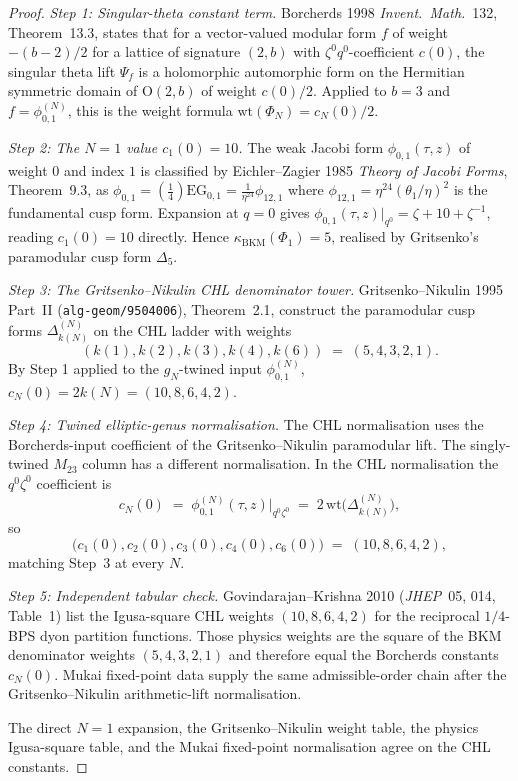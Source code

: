 \documentclass[11pt]{article}
\newcommand{\wt}{\mathrm{wt}}
\begin{document}
\begin{proof}
\emph{Step 1: Singular-theta constant term.} Borcherds 1998
\emph{Invent.\ Math.}~132, Theorem~13.3, states that for a vector-valued
modular form $f$ of weight $-(b-2)/2$ for a lattice of signature
$(2,b)$ with $\zeta^0 q^0$-coefficient $c(0)$, the singular theta lift
$\Psi_f$ is a holomorphic automorphic form on the Hermitian symmetric
domain of $\mathrm{O}(2,b)$ of weight $c(0)/2$. Applied to $b=3$ and
$f=\phi_{0,1}^{(N)}$, this is the weight formula
$\wt(\Phi_N)=c_N(0)/2$.

\emph{Step 2: The $N=1$ value $c_1(0)=10$.} The weak Jacobi form
$\phi_{0,1}(\tau,z)$ of weight $0$ and index $1$ is classified by
Eichler--Zagier 1985 \emph{Theory of Jacobi Forms}, Theorem~9.3, as
$\phi_{0,1}=(\tfrac{1}{4})\mathrm{EG}_{0,1}=\tfrac{1}{\eta^{24}}
\phi_{12,1}$ where $\phi_{12,1}=\eta^{24}(\theta_1/\eta)^2$ is the
fundamental cusp form. Expansion at $q=0$ gives
$\phi_{0,1}(\tau,z)|_{q^0}=\zeta+10+\zeta^{-1}$, reading
$c_1(0)=10$ directly. Hence $\kappa_{\mathrm{BKM}}(\Phi_1)=5$, realised
by Gritsenko's paramodular cusp form $\Delta_5$.

\emph{Step 3: The Gritsenko--Nikulin CHL denominator tower.}
Gritsenko--Nikulin 1995 Part~II (\texttt{alg-geom/9504006}),
Theorem~2.1, construct the paramodular cusp forms
$\Delta_{k(N)}^{(N)}$ on the CHL ladder with weights
\[
  (k(1),k(2),k(3),k(4),k(6))\;=\;(5,4,3,2,1).
\]
By Step 1 applied to the $g_N$-twined input $\phi_{0,1}^{(N)}$,
$c_N(0)=2k(N)=(10,8,6,4,2)$.

\emph{Step 4: Twined elliptic-genus normalisation.} The CHL
normalisation uses the Borcherds-input coefficient of the
Gritsenko--Nikulin paramodular lift. The singly-twined $M_{23}$ column
has a different normalisation. In the CHL normalisation the
$q^0\zeta^0$ coefficient is
\[
  c_N(0)\;=\;
  \phi_{0,1}^{(N)}(\tau,z)\Big|_{q^0\zeta^0}
  \;=\;2\,\mathrm{wt}\bigl(\Delta_{k(N)}^{(N)}\bigr),
\]
so
\[
  \bigl(c_1(0),c_2(0),c_3(0),c_4(0),c_6(0)\bigr)
  \;=\;(10,8,6,4,2),
\]
matching Step~3 at every $N$.

\emph{Step 5: Independent tabular check.} Govindarajan--Krishna 2010
(\emph{JHEP}~05, 014, Table~1) list the Igusa-square CHL weights
$(10,8,6,4,2)$ for the reciprocal $1/4$-BPS dyon partition functions.
Those physics weights are the square of the BKM denominator weights
$(5,4,3,2,1)$ and therefore equal the Borcherds constants $c_N(0)$.
Mukai fixed-point data supply the same admissible-order chain after the
Gritsenko--Nikulin arithmetic-lift normalisation.

The direct $N=1$ expansion, the Gritsenko--Nikulin weight table, the
physics Igusa-square table, and the Mukai fixed-point normalisation
agree on the CHL constants.
\end{proof}
\end{document}
